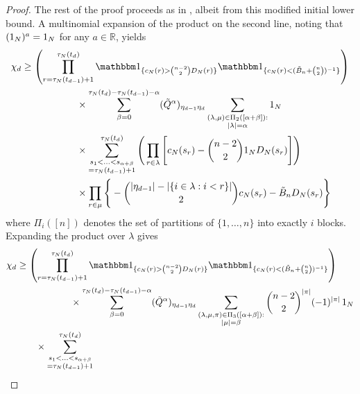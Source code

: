 \begin{proof}
The rest of the proof proceeds as in \textcite{koskela2018}, albeit from this modified initial lower bound.
A multinomial expansion of the product on the second line, noting that $(1_N)^a = 1_N$ for any $a\in\mathbb{R}$, yields
\begin{align*}
\chi_d 
&\geq \left( \prod_{r=\tau_N(t_{d-1})+1}^{\tau_N(t_d)}
        \I{ c_N(r) > \binom{n-2}{2} D_N(r) } 
        \I{ c_N(r) < (\tilde{B}_n + \binom{n}{2})^{-1} } \right) \\
    &\hspace{2cm}\times \sum_{ \beta = 0 }
        ^{ \tau_N( t_d ) - \tau_N( t_{ d - 1 } ) - \alpha } 
        ( \tilde{ Q }^{ \alpha } )_{ \eta_{ d - 1 } \eta_d } 
        \sum_{\substack{ ( \lambda, \mu ) \in \Pi_2( [ \alpha + \beta ] ) :
        \\ | \lambda | = \alpha }} \ON \\
    &\hspace{2cm}\times \sum_{\substack{ s_1 < \ldots < s_{ \alpha + \beta } 
        \\= \tau_N( t_{ d - 1 } ) + 1 }}^{ \tau_N( t_d ) } \Bigg( \prod_{ r \in \lambda }
        \Bigg[ c_N( s_r ) - \binom{ n - 2 }{ 2 } \ON D_N( s_r ) \Bigg] \Bigg)\\
    &\hspace{2cm}\times \prod_{ r \in \mu } \Bigg\{ - 
        \binom{ | \eta_{ d - 1 } | - | \{ i \in \lambda : i < r \} | }{ 2 } c_N( s_r ) 
        - \tilde{B}_n D_N( s_r ) \Bigg\}
\end{align*}
where $\Pi_i([n])$ denotes the set of partitions of $\{1, \dots,n\}$ into exactly $i$ blocks.
Expanding the product over $\lambda$ gives
\begin{align*}
\chi_d 
&\geq \left( \prod_{r=\tau_N(t_{d-1})+1}^{\tau_N(t_d)}
        \I{ c_N(r) > \binom{n-2}{2} D_N(r) } 
        \I{ c_N(r) < (\tilde{B}_n + \binom{n}{2})^{-1} } \right) \\
    &\hspace{2cm}\times \sum_{ \beta = 0 }
        ^{ \tau_N( t_d ) - \tau_N( t_{ d - 1 } ) - \alpha } 
        ( \tilde{ Q }^{ \alpha } )_{ \eta_{ d - 1 } \eta_d } 
        \sum_{\substack{ ( \lambda, \mu, \pi ) \in \Pi_3( [ \alpha + \beta ] ) :
        \\ | \mu | = \beta }} \binom{ n - 2 }{ 2 }^{ | \pi | } ( -1 )^{ | \pi | } \, \ON \\
    &\qquad \times \sum_{\substack{ s_1 < \ldots < s_{ \alpha + \beta } 
        \\ = \tau_N( t_{ d - 1 } ) + 1 }}^{ \tau_N( t_d ) } 

\end{align*}
\end{proof}
